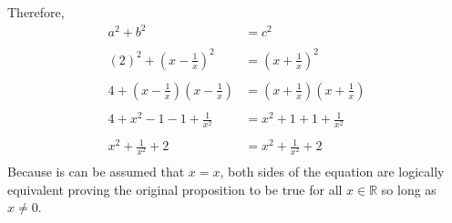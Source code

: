\documentclass[12pt]{article}
\begin{document}
\begin{enumerate}
Therefore,
\begin{align*}
     a^2 + b^2 &= c^2\\\\
     (2)^2 + (x-\frac{1}{x})^2 &= (x+\frac{1}{x})^2\\\\
     4 + (x-\frac{1}{x})(x-\frac{1}{x}) &= (x+\frac{1}{x})(x+\frac{1}{x})\\\\
     4 + x^2 - 1 - 1 + \frac{1}{x^2} &= x^2 + 1 + 1 + \frac{1}{x^2}\\\\
     x^2 + \frac{1}{x^2} + 2 &= x^2 + \frac{1}{x^2} + 2\\
\end{align*} 
Because is can be assumed that $x=x$, both sides of the equation are logically equivalent proving the original proposition to be true for all $x \in \mathbb R$ so long as $x \ne 0$.
\end{enumerate}
\end{document}
